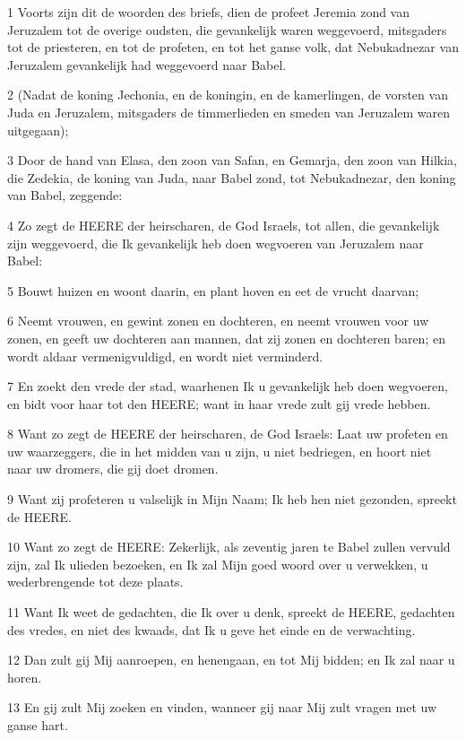 \par 1 Voorts zijn dit de woorden des briefs, dien de profeet Jeremia zond van Jeruzalem tot de overige oudsten, die gevankelijk waren weggevoerd, mitsgaders tot de priesteren, en tot de profeten, en tot het ganse volk, dat Nebukadnezar van Jeruzalem gevankelijk had weggevoerd naar Babel.
\par 2 (Nadat de koning Jechonia, en de koningin, en de kamerlingen, de vorsten van Juda en Jeruzalem, mitsgaders de timmerlieden en smeden van Jeruzalem waren uitgegaan);
\par 3 Door de hand van Elasa, den zoon van Safan, en Gemarja, den zoon van Hilkia, die Zedekia, de koning van Juda, naar Babel zond, tot Nebukadnezar, den koning van Babel, zeggende:
\par 4 Zo zegt de HEERE der heirscharen, de God Israels, tot allen, die gevankelijk zijn weggevoerd, die Ik gevankelijk heb doen wegvoeren van Jeruzalem naar Babel:
\par 5 Bouwt huizen en woont daarin, en plant hoven en eet de vrucht daarvan;
\par 6 Neemt vrouwen, en gewint zonen en dochteren, en neemt vrouwen voor uw zonen, en geeft uw dochteren aan mannen, dat zij zonen en dochteren baren; en wordt aldaar vermenigvuldigd, en wordt niet verminderd.
\par 7 En zoekt den vrede der stad, waarhenen Ik u gevankelijk heb doen wegvoeren, en bidt voor haar tot den HEERE; want in haar vrede zult gij vrede hebben.
\par 8 Want zo zegt de HEERE der heirscharen, de God Israels: Laat uw profeten en uw waarzeggers, die in het midden van u zijn, u niet bedriegen, en hoort niet naar uw dromers, die gij doet dromen.
\par 9 Want zij profeteren u valselijk in Mijn Naam; Ik heb hen niet gezonden, spreekt de HEERE.
\par 10 Want zo zegt de HEERE: Zekerlijk, als zeventig jaren te Babel zullen vervuld zijn, zal Ik ulieden bezoeken, en Ik zal Mijn goed woord over u verwekken, u wederbrengende tot deze plaats.
\par 11 Want Ik weet de gedachten, die Ik over u denk, spreekt de HEERE, gedachten des vredes, en niet des kwaads, dat Ik u geve het einde en de verwachting.
\par 12 Dan zult gij Mij aanroepen, en henengaan, en tot Mij bidden; en Ik zal naar u horen.
\par 13 En gij zult Mij zoeken en vinden, wanneer gij naar Mij zult vragen met uw ganse hart.

